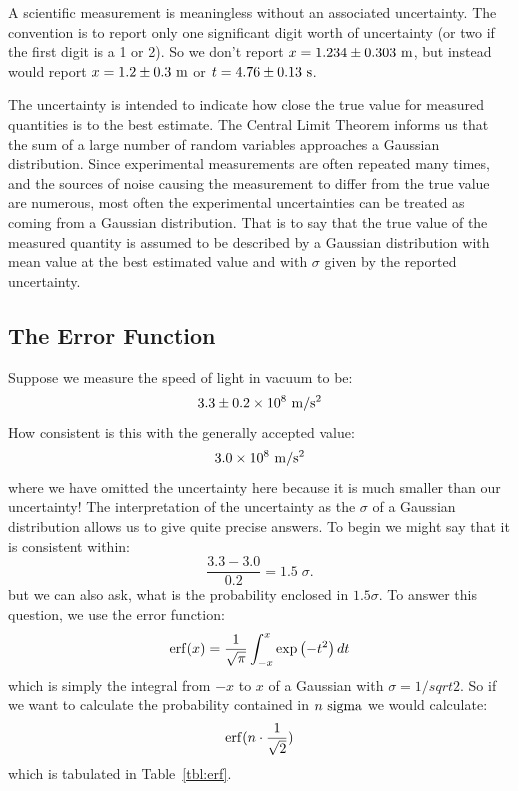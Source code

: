 \documentclass[12pt]{article}
\begin{document}
A scientific measurement is meaningless without an associated uncertainty.  The convention is to report only one significant digit worth of uncertainty (or two if the first digit is a 1 or 2).  So we don't report $x = 1.234 \pm 0.303~\rm{m}$, but instead would report $x= 1.2 \pm 0.3~\rm{m}$ or $t = 4.76 \pm 0.13~\rm{s}$. 

The uncertainty is intended to indicate how close the true value for measured quantities is to the best estimate.  The Central Limit Theorem informs us that the sum of a large number of random variables approaches a Gaussian distribution.  Since experimental measurements are often repeated many times, and the sources of noise causing the measurement to differ from the true value are numerous, most often the experimental uncertainties can be treated as coming from a Gaussian distribution.  That is to say that the true value of the measured quantity is assumed to be described by a Gaussian distribution with mean value at the best estimated value and with $\sigma$ given by the reported uncertainty.

\subsection{The Error Function}

Suppose we measure the speed of light in vacuum to be:
\begin{displaymath}
3.3 \pm 0.2 \times 10^8~{\rm m}/{\rm s}^2
\end{displaymath}
How consistent is this with the generally accepted value:
\begin{displaymath}
3.0 \times 10^8~{\rm m}/{\rm s}^2
\end{displaymath}
where we have omitted the uncertainty here because it is much smaller than our uncertainty!   The interpretation of the uncertainty as the $\sigma$ of a Gaussian distribution allows us to give quite precise answers.  To begin we might say that it is consistent within:
\begin{displaymath}
\frac{3.3 - 3.0}{0.2} = 1.5 \; \sigma.
\end{displaymath}
but we can also ask, what is the probability enclosed in $1.5 \sigma$.  To  answer this question, we use the error function:
\begin{displaymath}
{\rm erf}(x) = \frac{1}{\sqrt{\pi}} \int^x_{-x} \exp\left(-t^2 \right) dt
\end{displaymath}
which is simply the integral from $-x$ to $x$ of a Gaussian with $\sigma = 1/sqrt{2}$.  So if we want to calculate the probability contained in $n~\rm sigma$ we would calculate:
\begin{displaymath}
 {\rm erf}(n \cdot \frac{1}{\sqrt{2}})
\end{displaymath}
which is tabulated in Table~\ref{tbl:erf}.\\
\end{document}
